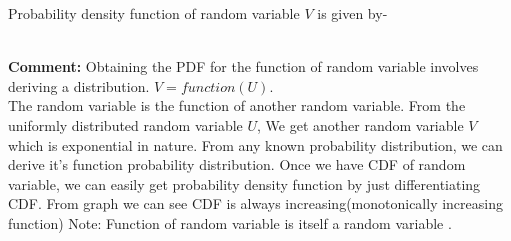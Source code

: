 \documentclass[journal,12pt,twocoloums]{IEEEtran}
\begin{document}
\hskip 5pt
Probability density function of random variable $V$ is given by-

\\


\textbf{Comment:}
Obtaining  the PDF for the function of random variable involves deriving a distribution.
$V= function(U)$.\\
The random variable is the function of another random variable.
From the uniformly distributed random variable $U$, We get another random variable $V$ which is exponential in nature. From any known probability distribution, we can derive it's function probability distribution.
Once we have CDF of random variable, we can easily get probability density function by just differentiating CDF. 
From graph we can see CDF is always increasing(monotonically increasing function) 
Note: Function of random variable is itself a random variable . 


\end{document}
